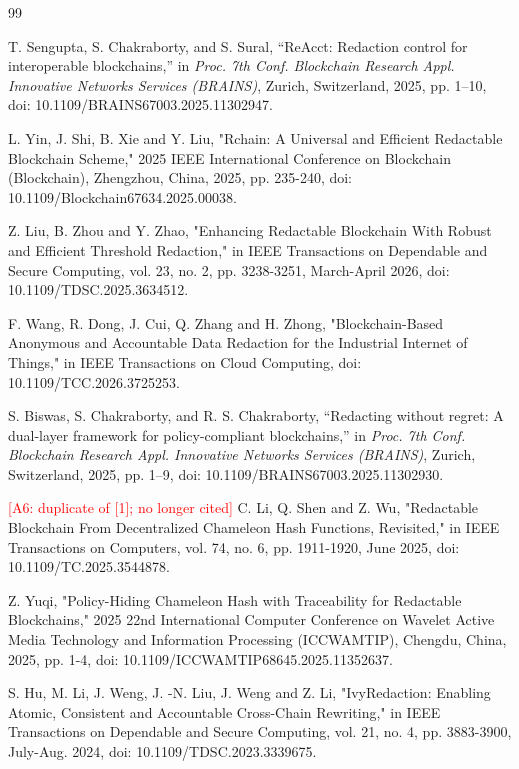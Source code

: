 \documentclass[lettersize,journal]{IEEEtran}
\begin{document}
\begin{thebibliography}{99}
    
    T. Sengupta, S. Chakraborty, and S. Sural,
    ``ReAcct: Redaction control for interoperable blockchains,''
    in \textit{Proc. 7th Conf. Blockchain Research Appl. Innovative
    Networks Services (BRAINS)}, Zurich, Switzerland, 2025,
    pp. 1--10, doi: 10.1109/BRAINS67003.2025.11302947.
    
    L. Yin, J. Shi, B. Xie and Y. Liu, "Rchain: A Universal and Efficient Redactable Blockchain Scheme," 2025 IEEE International Conference on Blockchain (Blockchain), Zhengzhou, China, 2025, pp. 235-240, doi: 10.1109/Blockchain67634.2025.00038.
    
    Z. Liu, B. Zhou and Y. Zhao, "Enhancing Redactable Blockchain With Robust and Efficient Threshold Redaction," in IEEE Transactions on Dependable and Secure Computing, vol. 23, no. 2, pp. 3238-3251, March-April 2026, doi: 10.1109/TDSC.2025.3634512.
    
    F. Wang, R. Dong, J. Cui, Q. Zhang and H. Zhong, "Blockchain-Based Anonymous and Accountable Data Redaction for the Industrial Internet of Things," in IEEE Transactions on Cloud Computing, doi: 10.1109/TCC.2026.3725253.
    
    S. Biswas, S. Chakraborty, and R. S. Chakraborty,
    ``Redacting without regret: A dual-layer framework for
    policy-compliant blockchains,''
    in \textit{Proc. 7th Conf. Blockchain Research Appl. Innovative
    Networks Services (BRAINS)}, Zurich, Switzerland, 2025,
    pp. 1--9, doi: 10.1109/BRAINS67003.2025.11302930.
    
    \textcolor{red}{[A6: duplicate of [1]; no longer cited]} 
    C. Li, Q. Shen and Z. Wu, "Redactable Blockchain From Decentralized Chameleon Hash Functions, Revisited," in IEEE Transactions on Computers, vol. 74, no. 6, pp. 1911-1920, June 2025, doi: 10.1109/TC.2025.3544878.
    
    Z. Yuqi, "Policy-Hiding Chameleon Hash with Traceability for Redactable Blockchains," 2025 22nd International Computer Conference on Wavelet Active Media Technology and Information Processing (ICCWAMTIP), Chengdu, China, 2025, pp. 1-4, doi: 10.1109/ICCWAMTIP68645.2025.11352637.
    
    S. Hu, M. Li, J. Weng, J. -N. Liu, J. Weng and Z. Li, "IvyRedaction: Enabling Atomic, Consistent and Accountable Cross-Chain Rewriting," in IEEE Transactions on Dependable and Secure Computing, vol. 21, no. 4, pp. 3883-3900, July-Aug. 2024, doi: 10.1109/TDSC.2023.3339675.
    

\end{thebibliography}
\end{document}
